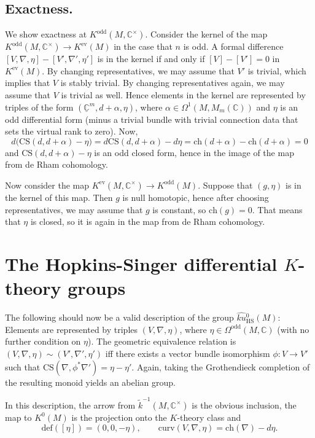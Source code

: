 \documentclass[a4paper]{book}
\newcommand{\bC}{\mathbb{C}}
\newcommand{\ch}{\mathrm{ch}}
\theoremstyle{definition}
\theoremstyle{remark}
\numberwithin{equation}{section}
\begin{document}
\subsection{Exactness.}
We show exactness at $K^{\mathrm{odd}}(M, \bC^\times)$. Consider the kernel of the map $K^{\mathrm{odd}}(M, \bC^\times) \to K^{\mathrm{ev}}(M)$ in the case that $n$ is odd. A formal difference $[V, \nabla, \eta] - [V', \nabla', \eta']$ is in the kernel if and only if $[V] - [V'] = 0$ in $K^{\mathrm{ev}}(M)$. By changing representatives, we may assume that $V'$ is trivial, which implies that $V$ is stably trivial. By changing representatives again, we may assume that $V$ is trivial as well. Hence elements in the kernel are represented by triples of the form $(\underline{\bC}^m, d+\alpha, \eta)$, where $\alpha \in \Omega^1(M, M_m(\bC))$ and $\eta$ is an odd differential form (minus a trivial bundle with trivial connection data that sets the virtual rank to zero). Now, 
\[
d\bigl(\mathrm{CS}(d, d+\alpha) - \eta\bigr) =  d\mathrm{CS}(d, d+\alpha) - d\eta = \ch(d+\alpha) - \ch(d+\alpha) = 0
\]
and $\mathrm{CS}(d, d+\alpha) - \eta$ is an odd closed form, hence in the image of the map from de Rham cohomology.

Now consider the map $K^{\mathrm{ev}}(M, \bC^\times) \to K^{\mathrm{odd}}(M)$.
Suppose that $(g, \eta)$ is in the kernel of this map. Then $g$ is null homotopic, hence after choosing representatives, we may assume that $g$ is constant, so $\ch(g) = 0$. That means that $\eta$ is closed, so it is again in the map from de Rham cohomology.

\section{The Hopkins-Singer differential \texorpdfstring{$K$}{K}-theory groups}

The following should now be a valid description of the group $\widehat{ku}{}^0_{\mathrm{HS}}(M)$: Elements are represented by triples $(V, \nabla, \eta)$, where $\eta \in \Omega^{\mathrm{odd}}(M, \bC)$ (with no further condition on $\eta$). The geometric equivalence relation is $(V, \nabla, \eta) \sim (V', \nabla', \eta')$ iff there exists a vector bundle isomorphism $\phi : V \to V'$ such that $ \mathrm{CS}(\nabla, \phi^*\nabla') = \eta - \eta'$. Again, taking the Grothendieck completion of the resulting monoid yields an abelian group.

In this description, the arrow from $\tilde{k}^{-1}(M, \bC^\times)$ is the obvious inclusion, the map to $K^0(M)$ is the projection onto the $K$-theory class and
\[
\mathrm{def}([\eta]) = (0, 0, -\eta), \qquad \mathrm{curv}(V, \nabla, \eta) = \ch(\nabla) - d\eta.
\]
\end{document}
